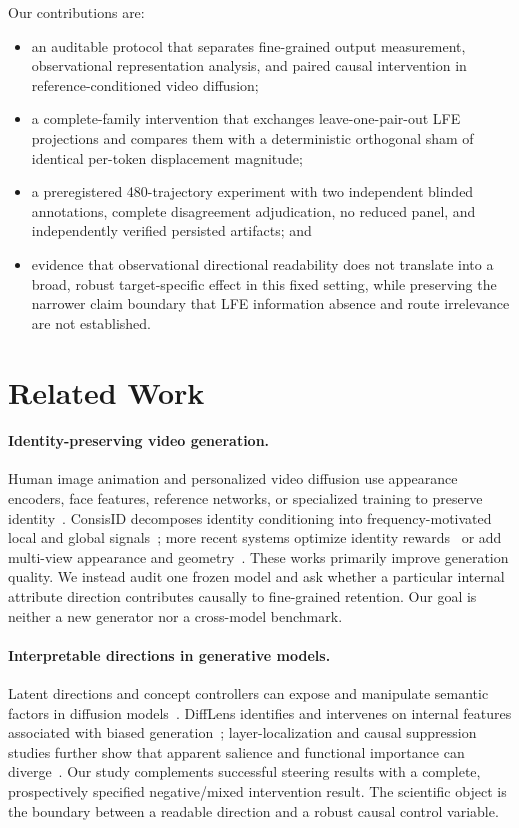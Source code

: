 \documentclass[10pt,twocolumn,letterpaper]{article}
\begin{document}
Our contributions are:
\begin{itemize}[leftmargin=*,nosep]
  \item an auditable protocol that separates fine-grained output measurement, observational representation analysis, and paired causal intervention in reference-conditioned video diffusion;
  \item a complete-family intervention that exchanges leave-one-pair-out LFE projections and compares them with a deterministic orthogonal sham of identical per-token displacement magnitude;
  \item a preregistered 480-trajectory experiment with two independent blinded annotations, complete disagreement adjudication, no reduced panel, and independently verified persisted artifacts; and
  \item evidence that observational directional readability does not translate into a broad, robust target-specific effect in this fixed setting, while preserving the narrower claim boundary that LFE information absence and route irrelevance are not established.
\end{itemize}

\section{Related Work}
\label{sec:related}

\paragraph{Identity-preserving video generation.}
Human image animation and personalized video diffusion use appearance encoders, face features, reference networks, or specialized training to preserve identity~\cite{xu2024magicanimate,cui2025hallo3,tu2025stableanimator,zhang2025magicmirror}.  ConsisID decomposes identity conditioning into frequency-motivated local and global signals~\cite{yuan2025consisid}; more recent systems optimize identity rewards~\cite{shen2026ipro} or add multi-view appearance and geometry~\cite{wu2026considgen}.  These works primarily improve generation quality.  We instead audit one frozen model and ask whether a particular internal attribute direction contributes causally to fine-grained retention.  Our goal is neither a new generator nor a cross-model benchmark.

\paragraph{Interpretable directions in generative models.}
Latent directions and concept controllers can expose and manipulate semantic factors in diffusion models~\cite{li2024interpretdiffusion,dalva2024noiseclr,kulkarni2025posthoc}.  DiffLens identifies and intervenes on internal features associated with biased generation~\cite{shi2025difflens}; layer-localization and causal suppression studies further show that apparent salience and functional importance can diverge~\cite{zaleska2026choices,wu2026attentionsinks}.  Our study complements successful steering results with a complete, prospectively specified negative/mixed intervention result.  The scientific object is the boundary between a readable direction and a robust causal control variable.
\end{document}
